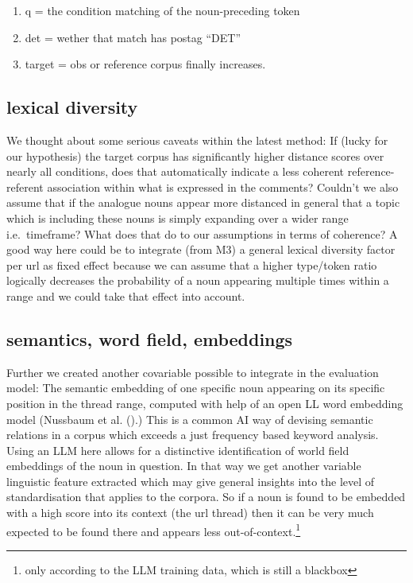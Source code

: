 \documentclass[12pt,a4paper]{article}
\begin{document}
\begin{enumerate}
\def\labelenumi{\arabic{enumi}.}
\tightlist
\item
  q = the condition matching of the noun-preceding token
\item
  det = wether that match has postag ``DET''
\item
  target = obs or reference corpus
  finally increases.
\end{enumerate}

\subsection{lexical diversity}\label{lexical-diversity}

We thought about some serious caveats within the latest method: If (lucky for our hypothesis) the target corpus has significantly higher distance scores over nearly all conditions, does that automatically indicate a less coherent reference-referent association within what is expressed in the comments? Couldn't we also assume that if the analogue nouns appear more distanced in general that a topic which is including these nouns is simply expanding over a wider range i.e.~timeframe? What does that do to our assumptions in terms of coherence? A good way here could be to integrate (from M3) a general lexical diversity factor per url as fixed effect because we can assume that a higher type/token ratio logically decreases the probability of a noun appearing multiple times within a range and we could take that effect into account.

\subsection{semantics, word field, embeddings}\label{semantics-word-field-embeddings}

Further we created another covariable possible to integrate in the evaluation model: The semantic embedding of one specific noun appearing on its specific position in the thread range, computed with help of an open LL word embedding model (Nussbaum et al. ().) This is a common AI way of devising semantic relations in a corpus which exceeds a just frequency based keyword analysis. Using an LLM here allows for a distinctive identification of world field embeddings of the noun in question. In that way we get another variable linguistic feature extracted which may give general insights into the level of standardisation that applies to the corpora. So if a noun is found to be embedded with a high score into its context (the url thread) then it can be very much expected to be found there and appears less out-of-context.\footnote{only according to the LLM training data, which is still a blackbox}
\end{document}
